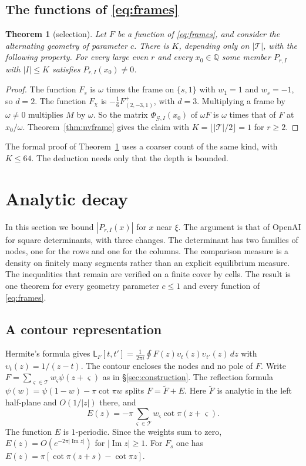 \documentclass[11pt]{amsart}
\newtheorem{theorem}{Theorem}[section]
\theoremstyle{definition}
\theoremstyle{remark}
\numberwithin{equation}{section}
\newcommand{\Q}{\mathbb Q}
\renewcommand{\Im}{\operatorname{Im}}
\newcommand{\Lw}{\mathsf L}          %
\begin{document}
\subsection{The functions of \eqref{eq:frames}}
\begin{theorem}[selection]\label{thm:selection}
Let $F$ be a function of \eqref{eq:frames}, and consider the alternating geometry of parameter $c$. There is $K$, depending
only on $|\mathcal T|$, with the following property. For every large even $r$ and
every $x_0\in\Q$ some member $P_{r,I}$ with $|I|\le K$ satisfies $P_{r,I}(x_0)\ne0$.
\end{theorem}
\begin{proof}
The function $F_s$ is $\omega$ times the frame on $\{s,1\}$ with $w_1=1$ and $w_s=-1$, so $d=2$. The function $F_\chi$
is $-\frac16F^+_{(2,-3,1)}$, with $d=3$. Multiplying a frame by $\omega\ne0$ multiplies $M$ by $\omega$. So the matrix
$\Phi_{\mathcal G,I}(x_0)$ of $\omega F$ is $\omega$ times that of $F$ at $x_0/\omega$. Theorem~\ref{thm:nvframe} gives the
claim with $K=\lfloor|\mathcal T|/2\rfloor=1$ for $r\ge2$.
\end{proof}

The formal proof of Theorem~\ref{thm:selection} uses a coarser count of the same kind, with $K\le64$. The deduction
needs only that the depth is bounded.

\section{Analytic decay}\label{sec:decay}

In this section we bound $|P_{r,I}(x)|$ for $x$ near $\xi$. The argument is that of OpenAI \cite{OpenAI2026} for square
determinants, with three changes. The determinant has two families of nodes, one for the rows and one for the columns.
The comparison measure is a density on finitely many segments rather than an explicit equilibrium measure. The
inequalities that remain are verified on a finite cover by cells. The result is one theorem for every geometry parameter
$c\le1$ and every function of \eqref{eq:frames}.

\subsection{A contour representation}
Hermite's formula gives $\Lw_F[t,t']=\frac1{2\pi i}\oint F(z)\upsilon_t(z)\upsilon_{t'}(z)\,dz$ with
$\upsilon_t(z)=1/(z-t)$. The contour encloses the nodes and no pole of $F$. Write
$F=\sum_{\varsigma\in\mathcal T}w_\varsigma\psi(z+\varsigma)$ as in \S\ref{sec:construction}. The reflection formula
$\psi(w)=\psi(1-w)-\pi\cot\pi w$ splits $F=\tilde F+E$. Here $\tilde F$ is analytic in the left half-plane and
$O(1/|z|)$ there, and
\[
 E(z)=-\pi\sum_{\varsigma\in\mathcal T}w_\varsigma\cot\pi(z+\varsigma).
\]
The function $E$ is $1$-periodic. Since the weights sum to zero, $E(z)=O(e^{-2\pi|\Im z|})$ for $|\Im z|\ge1$. For
$F_s$ one has $E(z)=\pi[\cot\pi(z+s)-\cot\pi z]$.
\end{document}
